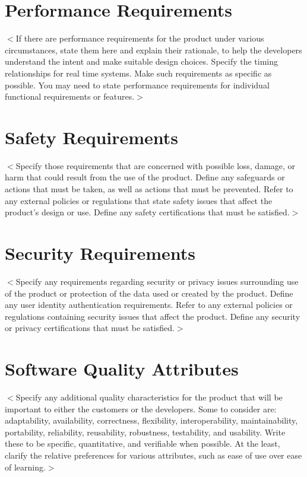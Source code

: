 \documentclass{scrreprt}
\begin{document}
\begin{CJK}{UTF8}{bkai}
\section{Performance Requirements}
$<$If there are performance requirements for the product under various 
circumstances, state them here and explain their rationale, to help the 
developers understand the intent and make suitable design choices. Specify the 
timing relationships for real time systems. Make such requirements as specific 
as possible. You may need to state performance requirements for individual 
functional requirements or features.$>$

\section{Safety Requirements}
$<$Specify those requirements that are concerned with possible loss, damage, or 
harm that could result from the use of the product. Define any safeguards or 
actions that must be taken, as well as actions that must be prevented. Refer to 
any external policies or regulations that state safety issues that affect the 
product’s design or use. Define any safety certifications that must be 
satisfied.$>$

\section{Security Requirements}
$<$Specify any requirements regarding security or privacy issues surrounding use 
of the product or protection of the data used or created by the product. Define 
any user identity authentication requirements. Refer to any external policies or 
regulations containing security issues that affect the product. Define any 
security or privacy certifications that must be satisfied.$>$

\section{Software Quality Attributes}
$<$Specify any additional quality characteristics for the product that will be 
important to either the customers or the developers. Some to consider are: 
adaptability, availability, correctness, flexibility, interoperability, 
maintainability, portability, reliability, reusability, robustness, testability, 
and usability. Write these to be specific, quantitative, and verifiable when 
possible. At the least, clarify the relative preferences for various attributes, 
such as ease of use over ease of learning.$>$


\end{CJK}
\end{document}
